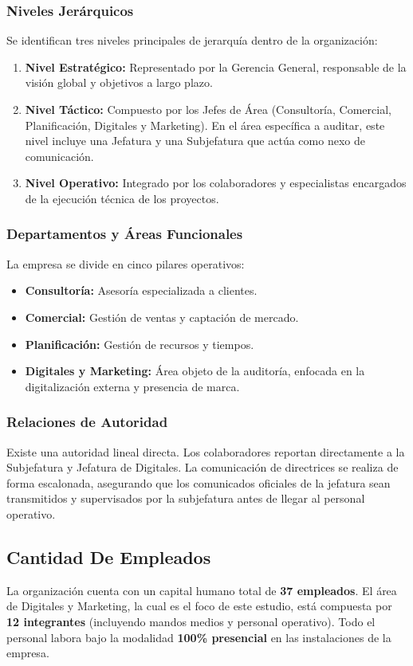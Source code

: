 \documentclass[12pt]{article}
\begin{document}
\subsubsection{Niveles Jerárquicos}
Se identifican tres niveles principales de jerarquía dentro de la organización:
\begin{enumerate}
    \item \textbf{Nivel Estratégico:} Representado por la Gerencia General, responsable de la visión global y objetivos a largo plazo.
    \item \textbf{Nivel Táctico:} Compuesto por los Jefes de Área (Consultoría, Comercial, Planificación, Digitales y Marketing). En el área específica a auditar, este nivel incluye una Jefatura y una Subjefatura que actúa como nexo de comunicación.
    \item \textbf{Nivel Operativo:} Integrado por los colaboradores y especialistas encargados de la ejecución técnica de los proyectos.
\end{enumerate}

\subsubsection{Departamentos y Áreas Funcionales}
La empresa se divide en cinco pilares operativos:
\begin{itemize}
    \item \textbf{Consultoría:} Asesoría especializada a clientes.
    \item \textbf{Comercial:} Gestión de ventas y captación de mercado.
    \item \textbf{Planificación:} Gestión de recursos y tiempos.
    \item \textbf{Digitales y Marketing:} Área objeto de la auditoría, enfocada en la digitalización externa y presencia de marca.
\end{itemize}

\subsubsection{Relaciones de Autoridad}
Existe una autoridad lineal directa. Los colaboradores reportan directamente a la Subjefatura y Jefatura de Digitales. La comunicación de directrices se realiza de forma escalonada, asegurando que los comunicados oficiales de la jefatura sean transmitidos y supervisados por la subjefatura antes de llegar al personal operativo.

\subsection{Cantidad De Empleados}
La organización cuenta con un capital humano total de \textbf{37 empleados}. El área de Digitales y Marketing, la cual es el foco de este estudio, está compuesta por \textbf{12 integrantes} (incluyendo mandos medios y personal operativo). Todo el personal labora bajo la modalidad \textbf{100\% presencial} en las instalaciones de la empresa.
\end{document}
